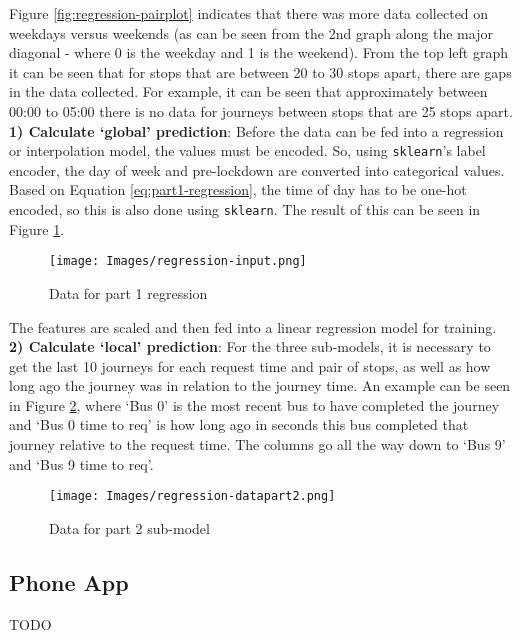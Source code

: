 Figure \ref{fig:regression-pairplot} indicates that there was more data collected on weekdays versus weekends (as can be seen from the 2nd graph along the major diagonal - where 0 is the weekday and 1 is the weekend). From the top left graph it can be seen that for stops that are between 20 to 30 stops apart, there are gaps in the data collected. For example, it can be seen that approximately between 00:00 to 05:00 there is no data for journeys between stops that are 25 stops apart.\\

\textbf{1) Calculate `global' prediction}: Before the data can be fed into a regression or interpolation model, the values must be encoded. So, using \texttt{sklearn}'s label encoder, the day of week and pre-lockdown are converted into categorical values. Based on Equation \ref{eq:part1-regression}, the time of day has to be one-hot encoded, so this is also done using \texttt{sklearn}. The result of this can be seen in Figure \ref{fig:regression-dataforregression}. 

\begin{figure}[H]
\begin{center}
    \texttt{[image: Images/regression-input.png]}
    \caption{Data for part 1 regression}
    \label{fig:regression-dataforregression}
\end{center}
\end{figure}

The features are scaled and then fed into a linear regression model for training. \\

\textbf{2) Calculate `local' prediction}: For the three sub-models, it is necessary to get the last 10 journeys for each request time and pair of stops, as well as how long ago the journey was in relation to the journey time. An example can be seen in Figure \ref{fig:regression-part2}, where `Bus 0' is the most recent bus to have completed the journey and `Bus 0 time to req' is how long ago in seconds this bus completed that journey relative to the request time. The columns go all the way down to `Bus 9' and `Bus 9 time to req'.

\begin{figure}[H]
\begin{center}
    \texttt{[image: Images/regression-datapart2.png]}
    \caption{Data for part 2 sub-model}
    \label{fig:regression-part2}
\end{center}
\end{figure}

\subsection{Phone App}

TODO 

\clearpage